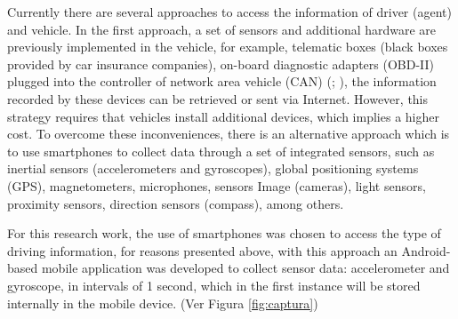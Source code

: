 Currently there are several approaches to access the information of driver (agent) and vehicle. In the first approach, a set of sensors and additional hardware are previously implemented in the vehicle, for example, telematic boxes (black boxes provided by car insurance companies), on-board diagnostic adapters (OBD-II) plugged into the controller of network area vehicle (CAN) (; ), the information recorded by these devices can be retrieved or sent via Internet. However, this strategy requires that vehicles install additional devices, which implies a higher cost. To overcome these inconveniences, there is an alternative approach which is to use smartphones to collect data through a set of integrated sensors, such as inertial sensors (accelerometers and gyroscopes), global positioning systems (GPS), magnetometers, microphones, sensors Image (cameras), light sensors, proximity sensors, direction sensors (compass), among others.

\vspace{5mm} %

For this research work, the use of smartphones was chosen to access the type of driving information, for reasons presented above, with this approach an Android-based mobile application was developed to collect sensor data: accelerometer and gyroscope, in intervals of 1 second, which in the first instance will be stored internally in the mobile device. (Ver Figura \ref{fig:captura})

